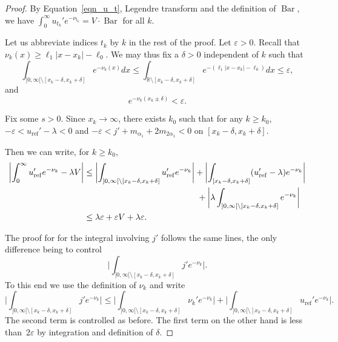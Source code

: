\documentclass[10pt]{amsart}
\let\epsilon\varepsilon
\theoremstyle{plain}
\theoremstyle{definition}
\DeclareMathOperator{\barDH}{Bar}
\begin{document}
\begin{proof}
By Equation~\eqref{eqn_u_t}, Legendre transform
and the definition of $\barDH$, we have
$\int_0^{\infty}u_{t_k}'e^{-\nu_{t_k}}= V\cdot \barDH$ for all $k$.

Let us abbreviate indices $t_k$ by $k$ in the rest of the proof.
Let $\epsilon>0$.
Recall that $\nu_k(x)\geq \ell_1|x-x_k|-\ell_0$.
We may thus fix a $\delta>0$ independent of $k$ such that
\begin{equation*}
\int_{]0,\infty[\setminus [x_k-\delta,x_k+\delta]}e^{-\nu_k(x)}dx
\leq \int_{\mathbb{R}\setminus [x_k-\delta,x_k+\delta]}e^{-( \ell_1|x-x_k|-\ell_0)}dx
\leq \epsilon,
\end{equation*}
and
\begin{equation*}
e^{-\nu_k(x_k\pm\delta)}<\epsilon.
\end{equation*}

Fix some $s>0$. Since $x_k\to \infty$, there exists $k_0$
such that for any $k\geq k_0$,
$-\epsilon<u_{\mathrm{ref}}'-\lambda<0$ and
$-\epsilon<j'+m_{\alpha_1}+2m_{2\alpha_1}<0$ on $[x_k-\delta,x_k+\delta]$.

Then we can write, for $k\geq k_0$,
\begin{align*}
\biggl|\int_0^{\infty}u_{\mathrm{ref}}'e^{-\nu_k} -\lambda V \biggr|
& \leq \biggl|\int_{]0,\infty[\setminus [x_k-\delta,x_k+\delta]}u_{\mathrm{ref}}'e^{-\nu_k} \biggr|+
\biggl|\int_{[x_k-\delta,x_k+\delta]}(u_{\mathrm{ref}}'-\lambda)e^{-\nu_k} \biggr| \\
& \hspace*{4.7cm} + \biggl |\lambda\int_{]0,\infty[\setminus [x_k-\delta,x_k+\delta]}e^{-\nu_k} \biggr| \\
& \leq \lambda\epsilon+\epsilon V+\lambda\epsilon.
\end{align*}

The proof for for the integral involving $j'$ follows the same lines, the only
difference being to control
\begin{equation*}
\biggl |\int_{]0,\infty[\setminus [x_k-\delta,x_k+\delta]}j'e^{-\nu_k} \biggr|.
\end{equation*}
To this end we use the definition of $\nu_k$ and write
\begin{equation*}
\biggl |\int_{]0,\infty[\setminus [x_k-\delta,x_k+\delta]}j'e^{-\nu_k} \biggr|
\leq \biggl |\int_{]0,\infty[\setminus [x_k-\delta,x_k+\delta]}\nu_{k}'e^{-\nu_k} \biggr|
+ \biggl |\int_{]0,\infty[\setminus [x_k-\delta,x_k+\delta]}u_{\mathrm{ref}}'e^{-\nu_k} \biggr|.
\end{equation*}
The second term is controlled as before.
The first term on the other hand is less than~$2\epsilon$ by
integration and definition of $\delta$.
\end{proof}
\end{document}
